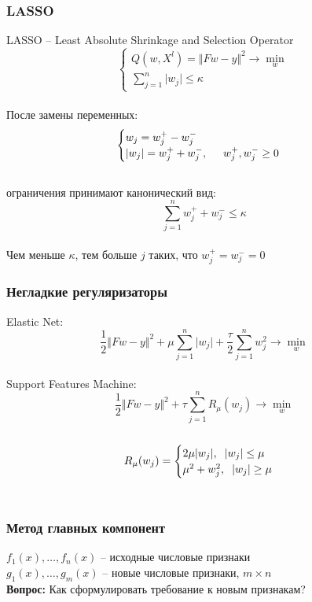 \documentclass[12pt, aspectratio=169]{beamer}
\begin{document}
\begin{frame}\frametitle{LASSO}
LASSO -- Least Absolute Shrinkage and Selection Operator\\
$$
\begin{cases} Q(w,X^l) = \Vert Fw - y \Vert^2 \rightarrow \min\limits_{w} \\
\sum_{j=1}^n \vert w_j \vert \leq \kappa
\end{cases}
$$\\
После замены переменных:\\
$$
\begin{cases} w_j = w_j^+ - w_j^-\\
\vert w_j \vert = w_j^+ + w_j^-, \hspace{5mm} w_j^+, w_j^- \geq 0\\

\end{cases}
$$\\
ограничения принимают канонический вид:\\
$$\sum\limits_{j=1}^n w_j^+ + w_j^- \leq \kappa$$\\
Чем меньше $\kappa$, тем больше $j$ таких, что $w_j^+ = w_j^- = 0$\\
\end{frame}

\begin{frame}\frametitle{Негладкие регуляризаторы}
Elastic Net:\\
$$\frac{1}{2} \Vert Fw - y \Vert^2 + \mu \sum\limits_{j=1}^n \vert w_j \vert + \frac{\tau}{2} \sum\limits_{j=1}^n w_j^2 \rightarrow \min\limits_{w}$$\\
Support Features Machine:\\
$$\frac{1}{2} \Vert Fw - y \Vert^2 + \tau \sum\limits_{j=1}^n R_{\mu}(w_j) \rightarrow \min\limits_{w}$$\\
$$ R_{\mu}(w_j) = \begin{cases} 2 \mu \vert w_j \vert, \hspace{2mm} \vert w_j \vert \leq \mu\\
\mu^2 + w_j^2, \hspace{2mm} \vert w_j \vert \geq \mu
\end{cases}$$\\
\end{frame}

\begin{frame}\frametitle{Метод главных компонент}
$f_1(x), \dots, f_n(x)$ -- исходные числовые признаки\\
$g_1(x), \dots, g_m(x)$ -- новые числовые признаки, $m \times n$\\
\vspace{5mm}
\textbf{Вопрос:} Как сформулировать требование к новым признакам?
\end{frame}
\end{document}
